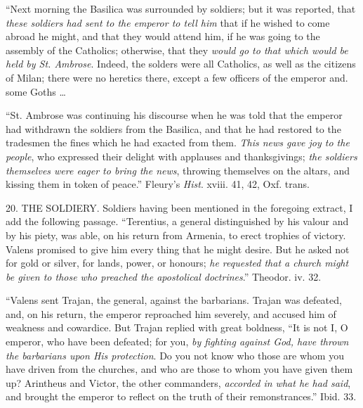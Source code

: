 ``Next morning the Basilica was surrounded by
soldiers; but it was reported, that \emph{these soldiers had sent to the
emperor to tell him} that if he wished to come abroad he might, and
that they would attend him, if he was going to the assembly of the
Catholics; otherwise, that they \emph{would go to that which would be held
by St. Ambrose}. Indeed, the solders were all Catholics, as well as
the citizens of Milan; there were no heretics there, except a few
officers of the emperor and. some Goths …

``St. Ambrose was continuing his discourse when he
was told that the emperor had withdrawn the soldiers from the Basilica,
and that he had restored to the tradesmen the fines which he had exacted
from them. \emph{This news gave joy to the people}, who expressed their
delight with applauses and thanksgivings; \emph{the soldiers themselves
were eager to bring the news}, throwing themselves on the altars, and
kissing them in token of peace.'' Fleury's \emph{Hist}. xviii. 41, 42,
Oxf. trans.

20. THE
SOLDIERY.
Soldiers having been mentioned in the foregoing extract, I add the
following passage. ``Terentius, a general distinguished by his valour and
by his piety, was able, on his return from Armenia, to erect trophies of
victory. Valens promised to give him every thing that he might desire.
But he asked not for gold or silver, for lands, power, or honours; \emph{he
requested that a church might be given to those who preached the
apostolical doctrines}.'' Theodor. iv. 32.

``Valens sent Trajan, the general, against the
barbarians. Trajan was defeated, and, on his return, the emperor
reproached him severely, and accused him of weakness and cowardice. But
Trajan replied with great boldness, ``It is not I, O emperor, who have
been defeated; for you, \emph{by fighting against God, have thrown the
barbarians upon His protection}. Do you not know who those are whom
you have driven from the churches, and who are those to whom you have
given them up? Arintheus and Victor, the other commanders, \emph{accorded
in what he had said}, and brought the emperor to reflect on the truth
of their remonstrances.'' Ibid. 33.

